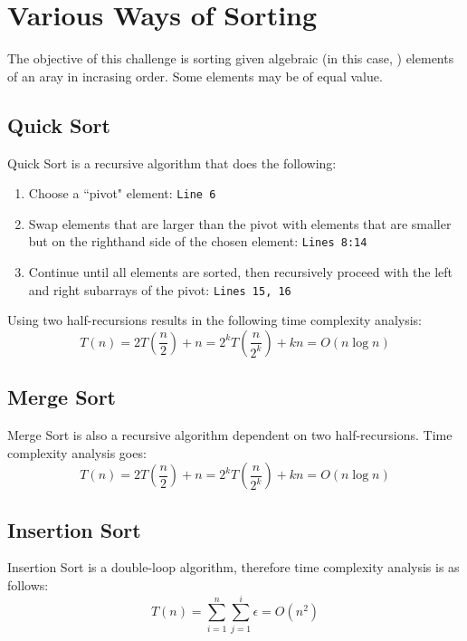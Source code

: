 \chapter{Various Ways of Sorting}
The objective of this challenge is sorting given algebraic (in this case,
) elements of an aray in incrasing order. Some elements may be of
equal value.

\section{Quick Sort}
Quick Sort is a recursive algorithm that does the following:
\begin{enumerate}
\item Choose a ``pivot" element: \texttt{Line 6}
\item Swap elements that are larger than the pivot with elements that are
    smaller but on the righthand side of the chosen element: \texttt{Lines 8:14}
\item Continue until all elements are sorted, then recursively proceed with the
    left and right subarrays of the pivot: \texttt{Lines 15, 16}
\end{enumerate}
Using two half-recursions results in the following time complexity analysis: \[
T(n)=2T\left(\frac{n}{2}\right)+n=2^kT\left(\frac{n}{2^k}\right)+kn=O(n\log n)\]

\section{Merge Sort}
Merge Sort is also a recursive algorithm dependent on two half-recursions. Time
complexity analysis goes: \[ T(n)=2T\left(\frac{n}{2}\right)+n=2^kT\left(\frac
{n}{2^k}\right)+kn=O(n\log n) \]

\section{Insertion Sort}
Insertion Sort is a double-loop algorithm, therefore time complexity analysis is
as follows: \[ T(n)=\sum_{i=1}^n\sum_{j=1}^i\epsilon=O(n^2) \]

